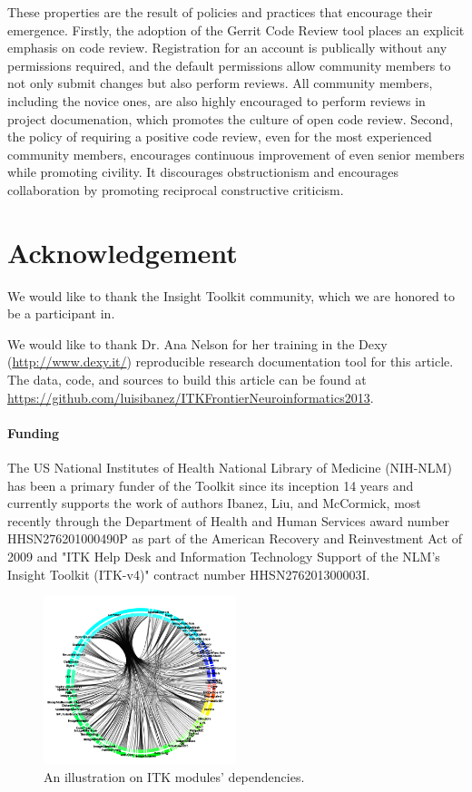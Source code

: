 \documentclass{frontiersENG} %
\begin{document}
These properties are the result of policies and practices that encourage their
emergence. Firstly, the adoption of the Gerrit Code Review tool places an
explicit emphasis on code review.  Registration for an account is publically
without any permissions required, and the default permissions allow community
members to not only submit changes but also perform reviews. All community
members, including the novice ones, are also highly encouraged to perform
reviews in project documenation, which promotes the culture of open code
review. Second, the policy of requiring a positive code review, even for the
most experienced community members, encourages continuous improvement of even
senior members while promoting civility. It discourages obstructionism and
encourages collaboration by promoting reciprocal constructive criticism.



\section*{Acknowledgement}

We would like to thank the Insight Toolkit community, which we are honored to
be a participant in.

We would like to thank Dr. Ana Nelson for her training in the Dexy
(\url{http://www.dexy.it/}) reproducible research documentation tool for this
article.  The data, code, and sources to build this article can be found at
\url{https://github.com/luisibanez/ITKFrontierNeuroinformatics2013}.

\paragraph{Funding\textcolon} The US National Institutes of Health National
Library of Medicine (NIH-NLM) has been a primary funder of the Toolkit since
its inception 14 years and currently supports the work of authors Ibanez, Liu,
and McCormick, most recently through the Department of Health and Human
Services award number HHSN276201000490P as part of the American Recovery and
Reinvestment Act of 2009 and "ITK Help Desk and Information Technology Support
of the NLM's Insight Toolkit (ITK-v4)" contract number HHSN276201300003I.





\begin{figure}
  \centering
    \includegraphics[width=0.5\textwidth]{itk_module_dependency.png}
    \caption{An illustration on ITK modules' dependencies.}
    \label{fig:itk_module_dependency}
\end{figure}
\end{document}
